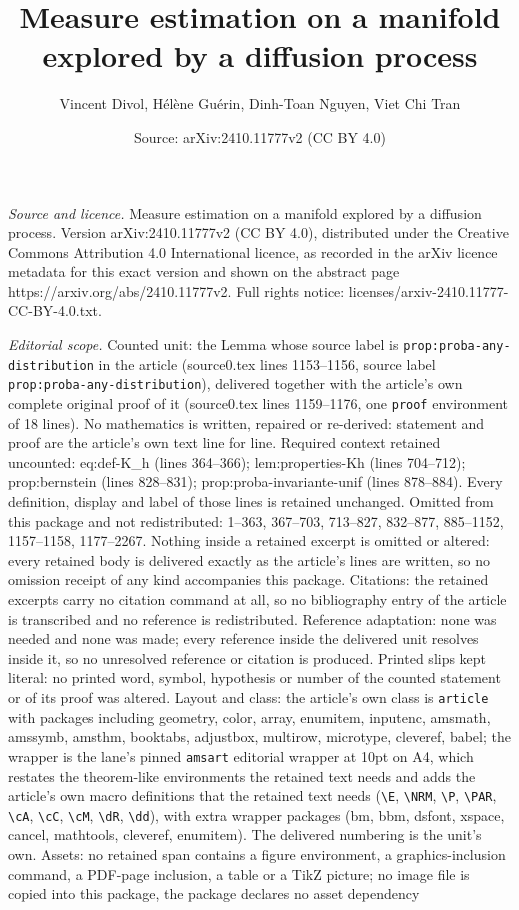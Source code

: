 \documentclass[10pt,a4paper]{amsart}
\title[Measure estimation on a manifold explored by a diffusion pro]{Measure estimation on a manifold explored by a diffusion process}
\author{Vincent Divol, H\'el\`ene Gu\'erin, Dinh-Toan Nguyen, Viet Chi Tran}
\date{Source: arXiv:2410.11777v2 (CC BY 4.0)}
\begin{document}
\maketitle

\noindent\emph{Source and licence.} Measure estimation on a manifold explored by a diffusion process. Version arXiv:2410.11777v2 (CC BY 4.0), distributed under the Creative Commons Attribution 4.0 International licence, as recorded in the arXiv licence metadata for this exact version and shown on the abstract page https://arxiv.org/abs/2410.11777v2. Full rights notice: licenses/arxiv-2410.11777-CC-BY-4.0.txt.\par\smallskip

\noindent\textit{Editorial scope.} Counted unit: the Lemma whose source label is \texttt{prop:proba-any-distribution} in the article (source0.tex lines 1153--1156, source label \texttt{prop:proba-any-distribution}), delivered together with the article's own complete original proof of it (source0.tex lines 1159--1176, one \texttt{proof} environment of 18 lines). No mathematics is written, repaired or re-derived: statement and proof are the article's own text line for line. Required context retained uncounted: eq:def-K\_h (lines 364--366); lem:properties-Kh (lines 704--712); prop:bernstein (lines 828--831); prop:proba-invariante-unif (lines 878--884). Every definition, display and label of those lines is retained unchanged. Omitted from this package and not redistributed: 1--363, 367--703, 713--827, 832--877, 885--1152, 1157--1158, 1177--2267. Nothing inside a retained excerpt is omitted or altered: every retained body is delivered exactly as the article's lines are written, so no omission receipt of any kind accompanies this package. Citations: the retained excerpts carry no citation command at all, so no bibliography entry of the article is transcribed and no reference is redistributed. Reference adaptation: none was needed and none was made; every reference inside the delivered unit resolves inside it, so no unresolved reference or citation is produced. Printed slips kept literal: no printed word, symbol, hypothesis or number of the counted statement or of its proof was altered. Layout and class: the article's own class is \texttt{article} with packages including geometry, color, array, enumitem, inputenc, amsmath, amssymb, amsthm, booktabs, adjustbox, multirow, microtype, cleveref, babel; the wrapper is the lane's pinned \texttt{amsart} editorial wrapper at 10pt on A4, which restates the theorem-like environments the retained text needs and adds the article's own macro definitions that the retained text needs (\texttt{\textbackslash E}, \texttt{\textbackslash NRM}, \texttt{\textbackslash P}, \texttt{\textbackslash PAR}, \texttt{\textbackslash cA}, \texttt{\textbackslash cC}, \texttt{\textbackslash cM}, \texttt{\textbackslash dR}, \texttt{\textbackslash dd}), with extra wrapper packages (bm, bbm, dsfont, xspace, cancel, mathtools, cleveref, enumitem). The delivered numbering is the unit's own. Assets: no retained span contains a figure environment, a graphics-inclusion command, a PDF-page inclusion, a table or a TikZ picture; no image file is copied into this package, the package declares no asset dependency 
\end{document}
